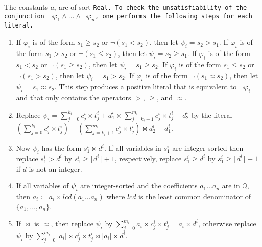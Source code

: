The constants $a_i$ are of sort \tt{Real}. To check the unsatisfiability of the conjunction $\lnot \varphi_1 \land \ldots \land \lnot \varphi_n$, one performs the following steps for each literal. 

\begin{enumerate}
    \item If $\varphi_i$ is of the form $s_1 \geq s_2$ or $\neg (s_1 < s_2)$, then let $\psi_i = s_2 > s_1$.
    If $\varphi_i$ is of the form $s_1 > s_2$ or $\neg (s_1 \leq s_2)$, then let $\psi_i = s_2 \geq s_1$.
    If $\varphi_i$ is of the form $s_1 < s_2$ or $\neg (s_1 \geq s_2)$, then let $\psi_i = s_1 \geq s_2$.
    If $\varphi_i$ is of the form $s_1 \leq s_2$ or $\neg (s_1 > s_2)$, then let $\psi_i = s_1 > s_2$.
    If $\varphi_i$ is of the form $\neg (s_1 \approx s_2)$, then let $\psi_i = s_1 \approx s_2$.
    This step produces a positive literal that is equivalent to $\lnot \varphi_i$ and that only contains the operators $>$, $\geq$, and $\approx$.


    \item Replace $\psi_i = \sum_{j=0}^{k_i}c_j^i\times{}t_j^i + d_1^i \bowtie \sum_{j=k_i+1}^{m_i} c_j^i\times{}t_j^i + d_2^i$ by the literal $\left(\sum_{j=0}^{k_i}c_j^i\times{}t_j^i\right) - \left(\sum_{j=k_i+1}^{m_i} c_j^i\times{}t_j^i\right)
    \bowtie d_2^i - d_1^i$.
  
    \item \label{la_generic:str}Now $\psi_i$ has the form $s_1^i \bowtie d^i$. If all
    variables in $s_1^i$ are integer-sorted then replace $s_1^i > d^i$ by $s_1^i \geq \lfloor d^i \rfloor + 1$,
    respectively, replace $s_1^i \geq d^i$ by $s_1^i \geq \lfloor d^i \rfloor + 1$ if $d$ is not an integer.

    \item If all variables of $\psi_i$ are integer-sorted and the coefficients $a_1 \dots a_n$ are in $\mathbb{Q}$,
    then $a_i \coloneq a_i \times \mathit{lcd}(a_1 \dots a_n)$ where $\mathit{lcd}$ is the least common denominator of $\{a_1, \dots, a_n\}$.
    
    \item If $\bowtie$ is $\approx$, then replace $\psi_i$ by
    $\sum_{j=0}^{m_i}a_i\times{}c_j^i\times{}t_j^i = a_i\times{}d^i$, otherwise replace $\psi_i$ by
    $\sum_{j=0}^{m_i}|a_i|\times{}c_j^i\times{}t_j^i \bowtie |a_i|\times{}d^i$.


\end{enumerate}
